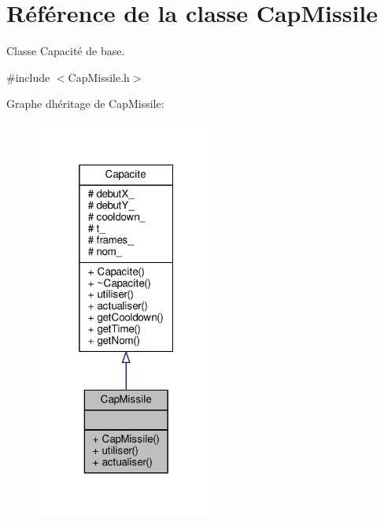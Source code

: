 \hypertarget{class_cap_missile}{}\section{Référence de la classe Cap\+Missile}
\label{class_cap_missile}


Classe Capacité de base.  




{\ttfamily \#include $<$Cap\+Missile.\+h$>$}



Graphe d\textquotesingle{}héritage de Cap\+Missile\+:\nopagebreak
\begin{figure}[H]
\begin{center}
\leavevmode
\includegraphics[width=169pt]{class_cap_missile__inherit__graph}
\end{center}
\end{figure}


